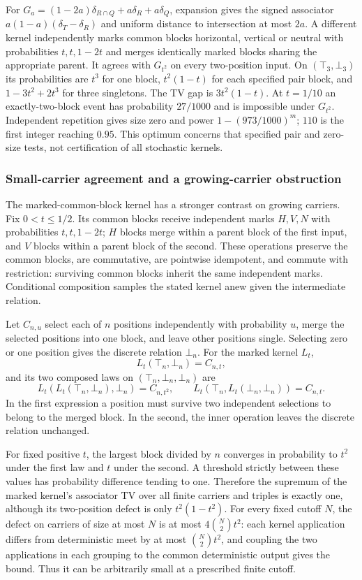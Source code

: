 For $G_a=(1-2a)\delta_{R\cap Q}+a\delta_R+a\delta_Q$, expansion gives the signed associator $a(1-a)(\delta_T-\delta_R)$ and uniform distance to intersection at most $2a$. A different kernel independently marks common blocks horizontal, vertical or neutral with probabilities $t,t,1-2t$ and merges identically marked blocks sharing the appropriate parent. It agrees with $G_{t^2}$ on every two-position input. On $(\top_3,\bot_3)$ its probabilities are $t^3$ for one block, $t^2(1-t)$ for each specified pair block, and $1-3t^2+2t^3$ for three singletons. The TV gap is $3t^2(1-t)$. At $t=1/10$ an exactly-two-block event has probability $27/1000$ and is impossible under $G_{t^2}$. Independent repetition gives size zero and power $1-(973/1000)^m$; $110$ is the first integer reaching $0.95$. This optimum concerns that specified pair and zero-size tests, not certification of all stochastic kernels.

\subsubsection{Small-carrier agreement and a growing-carrier obstruction}
\label{pat:marked-growing}

The marked-common-block kernel has a stronger contrast on growing
carriers.  Fix \(0<t\le1/2\).  Its common blocks receive independent
marks \(H,V,N\) with probabilities \(t,t,1-2t\); \(H\) blocks merge
within a parent block of the first input, and \(V\) blocks within a
parent block of the second.  These operations preserve the common
blocks, are commutative, are pointwise idempotent, and commute with
restriction: surviving common blocks inherit the same independent
marks.  Conditional composition samples the stated kernel anew given
the intermediate relation.

Let \(C_{n,u}\) select each of \(n\) positions independently with
probability \(u\), merge the selected positions into one block, and
leave other positions single.  Selecting zero or one position gives
the discrete relation \(\bot_n\).  For the marked kernel \(L_t\),
\[
 L_t(\top_n,\bot_n)=C_{n,t},
\]
and its two composed laws on \((\top_n,\bot_n,\bot_n)\) are
\[
 L_t(L_t(\top_n,\bot_n),\bot_n)=C_{n,t^2},\qquad
 L_t(\top_n,L_t(\bot_n,\bot_n))=C_{n,t}.
\]
In the first expression a position must survive two independent
selections to belong to the merged block.  In the second, the inner
operation leaves the discrete relation unchanged.

For fixed positive \(t\), the largest block divided by \(n\) converges
in probability to \(t^2\) under the first law and \(t\) under the second.
A threshold strictly between these values has probability difference
tending to one.  Therefore the supremum of the marked kernel's
associator TV over all finite carriers and triples is exactly one,
although its two-position defect is only \(t^2(1-t^2)\).
For every fixed cutoff \(N\), the defect on carriers of size at most
\(N\) is at most \(4\binom N2t^2\): each kernel application differs from
deterministic meet by at most \(\binom N2t^2\), and coupling the two
applications in each grouping to the common deterministic output
gives the bound.  Thus it can be arbitrarily small at a prescribed
finite cutoff.

